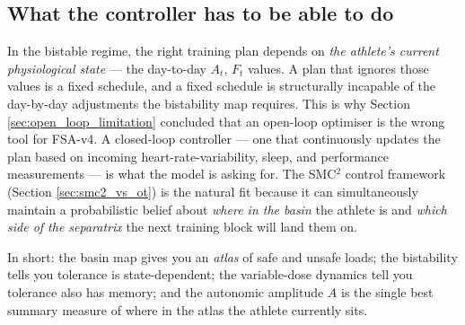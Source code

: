 \subsection{What the controller has to be able to do}

In the bistable regime, the right training plan depends on \emph{the athlete's current physiological state} — the day-to-day $A_t$, $F_t$ values. A plan that ignores those values is a fixed schedule, and a fixed schedule is structurally incapable of the day-by-day adjustments the bistability map requires. This is why Section \ref{sec:open_loop_limitation} concluded that an open-loop optimiser is the wrong tool for FSA-v4. A closed-loop controller — one that continuously updates the plan based on incoming heart-rate-variability, sleep, and performance measurements — is what the model is asking for. The SMC$^2$ control framework (Section \ref{sec:smc2_vs_ot}) is the natural fit because it can simultaneously maintain a probabilistic belief about \emph{where in the basin} the athlete is and \emph{which side of the separatrix} the next training block will land them on.

In short: the basin map gives you an \emph{atlas} of safe and unsafe loads; the bistability tells you tolerance is state-dependent; the variable-dose dynamics tell you tolerance also has memory; and the autonomic amplitude $A$ is the single best summary measure of where in the atlas the athlete currently sits.
